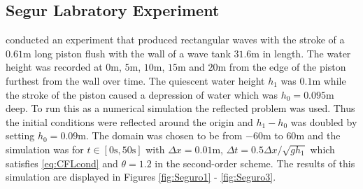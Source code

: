 \documentclass[SingleSpace,12pt,Proceedings]{Serre_ASCE}
\begin{document}
\subsection{Segur Labratory Experiment}\label{Laboratory_Experiments}
 conducted an experiment that produced rectangular waves with the stroke of a $0.61\text{m}$ long piston flush with the wall of a wave tank $31.6\text{m}$ in length. The water height was recorded at $0\text{m}$, $5\text{m}$, $10\text{m}$, $15\text{m}$ and $20\text{m}$ from the edge of the piston furthest from the wall over time. The quiescent water height $h_1$ was $0.1\text{m}$ while the stroke of the piston caused a depression of water which was $h_0 = 0.095\text{m}$ deep. To run this as a numerical simulation the reflected problem was used. Thus the initial conditions were reflected around the origin and $h_1 - h_0$ was doubled by setting $h_0 = 0.09\text{m}$. The domain was chosen to be from $-60\text{m}$ to $60\text{m}$ and the simulation was for $t \in [0\text{s},50\text{s}]$ with $\Delta x = 0.01 \text{m}$, $\Delta t = 0.5 \Delta x / \sqrt{g h_1}$ which satisfies \eqref{eq:CFLcond} and $\theta = 1.2$ in the second-order scheme. The results of this simulation are displayed in Figures \ref{fig:Seguro1} - \ref{fig:Seguro3}.
\end{document}
